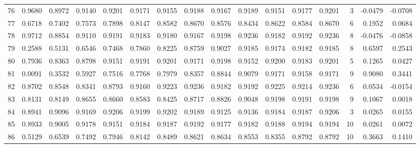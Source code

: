 \begin{tabular}{lrrrrrrrrrrrrrrr}
76  &      0.9680 &  0.8972 &  0.9140 &  0.9201 &  0.9171 &  0.9155 &  0.9188 &  0.9167 &  0.9189 &  0.9151 &   0.9177 &     0.9201 &      3 &                   -0.0479 &                    -0.0708 \\
77  &      0.6718 &  0.7402 &  0.7573 &  0.7898 &  0.8147 &  0.8582 &  0.8670 &  0.8576 &  0.8434 &  0.8622 &   0.8584 &     0.8670 &      6 &                    0.1952 &                     0.0684 \\
78  &      0.9712 &  0.8854 &  0.9110 &  0.9191 &  0.9183 &  0.9180 &  0.9167 &  0.9198 &  0.9236 &  0.9182 &   0.9192 &     0.9236 &      8 &                   -0.0476 &                    -0.0858 \\
79  &      0.2588 &  0.5131 &  0.6546 &  0.7468 &  0.7860 &  0.8225 &  0.8759 &  0.9027 &  0.9185 &  0.9174 &   0.9182 &     0.9185 &      8 &                    0.6597 &                     0.2543 \\
80  &      0.7936 &  0.8363 &  0.8798 &  0.9151 &  0.9191 &  0.9201 &  0.9171 &  0.9198 &  0.9152 &  0.9200 &   0.9183 &     0.9201 &      5 &                    0.1265 &                     0.0427 \\
81  &      0.0091 &  0.3532 &  0.5927 &  0.7516 &  0.7768 &  0.7979 &  0.8357 &  0.8844 &  0.9079 &  0.9171 &   0.9158 &     0.9171 &      9 &                    0.9080 &                     0.3441 \\
82  &      0.8702 &  0.8548 &  0.8341 &  0.8793 &  0.9160 &  0.9223 &  0.9236 &  0.9182 &  0.9192 &  0.9225 &   0.9214 &     0.9236 &      6 &                    0.0534 &                    -0.0154 \\
83  &      0.8131 &  0.8149 &  0.8655 &  0.8660 &  0.8583 &  0.8425 &  0.8717 &  0.8826 &  0.9048 &  0.9198 &   0.9191 &     0.9198 &      9 &                    0.1067 &                     0.0018 \\
84  &      0.8941 &  0.9096 &  0.9169 &  0.9206 &  0.9199 &  0.9202 &  0.9189 &  0.9125 &  0.9136 &  0.9184 &   0.9187 &     0.9206 &      3 &                    0.0265 &                     0.0155 \\
85  &      0.8933 &  0.9005 &  0.9178 &  0.9151 &  0.9184 &  0.9187 &  0.9192 &  0.9177 &  0.9182 &  0.9188 &   0.9194 &     0.9194 &     10 &                    0.0261 &                     0.0072 \\
86  &      0.5129 &  0.6539 &  0.7492 &  0.7946 &  0.8142 &  0.8489 &  0.8621 &  0.8634 &  0.8553 &  0.8355 &   0.8792 &     0.8792 &     10 &                    0.3663 &                     0.1410 \\

\end{tabular}

